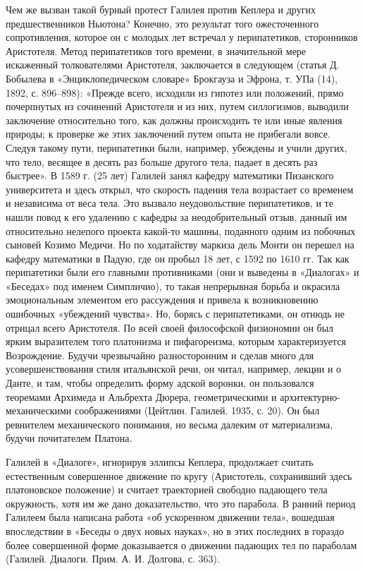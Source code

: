 Чем же вызван такой бурный протест Галилея против Кеплера и других
предшественников Ньютона? Конечно, это результат того ожесточенного
сопротивления, которое он с молодых лет встречал у перипатетиков, сторонников
Аристотеля. Метод перипатетиков того времени, в значительной мере искаженный
толкователями Аристотеля, заключается в следующем (статья Д. Бобылева в
«Энциклопедическом словаре» Брокгауза и Эфрона, т. УПа (14), 1892, с. 896--898):
«Прежде всего, исходили из гипотез или положений, прямо почерпнутых из
сочинений Аристотеля и из них, путем силлогизмов, выводили заключение
относительно того, как должны происходить те или иные явления природы; к
проверке же этих заключений путем опыта не прибегали вовсе. Следуя такому пути,
перипатетики были, например, убеждены и учили других, что тело, весящее в
десять раз больше другого тела, падает в десять раз быстрее». В 1589 г. (25
лет) Галилей занял кафедру математики Пизанского университета и здесь открыл,
что скорость падения тела возрастает со временем и независима от веса тела. Это
вызвало неудовольствие перипатетиков, и те нашли повод к его удалению с кафедры
за неодобрительный отзыв, данный им относительно нелепого проекта какой-то
машины, поданного одним из побочных сыновей Козимо Медичи. Но по ходатайству
маркиза дель Монти он перешел на кафедру математики в Падую, где он пробыл 18
лет, с 1592 по 1610 гг. Так как перипатетики были его главными противниками
(они и выведены в «Диалогах» и «Беседах» под именем Симпличио), то такая
непрерывная борьба и окрасила эмоциональным элементом его рассуждения и привела
к возникновению ошибочных «убеждений
чувства». Но, борясь с перипатетиками, он отнюдь не отрицал всего Аристотеля.
По всей своей философской физиономии он был ярким выразителем того платонизма и
пифагореизма, которым характеризуется Возрождение. Будучи чрезвычайно
разносторонним и сделав много для усовершенствования стиля итальянской речи, он
читал, например, лекции и о Данте, и там, чтобы определить форму адской
воронки, он пользовался теоремами Архимеда и Альбрехта Дюрера, геометрическими
и архитектурно-механическими соображениями (Цейтлин. Галилей. 1935, с. 20). Он
был ревнителем механического понимания, но весьма далеким от материализма,
будучи почитателем Платона.

Галилей в «Диалоге», игнорируя эллипсы Кеплера, продолжает считать естественным
совершенное движение по кругу (Аристотель, сохранивший здесь платоновское
положение) и считает траекторией свободно падающего тела окружность, хотя им же
дано доказательство, что это парабола. В ранний период Галилеем была написана
работа «об ускоренном движении тела», вошедшая впоследствии в «Беседы о двух
новых науках», но в этих последних в гораздо более совершенной форме
доказывается о движении падающих тел по параболам (Галилей. Диалоги. Прим. А.
И. Долгова, с. 363).

